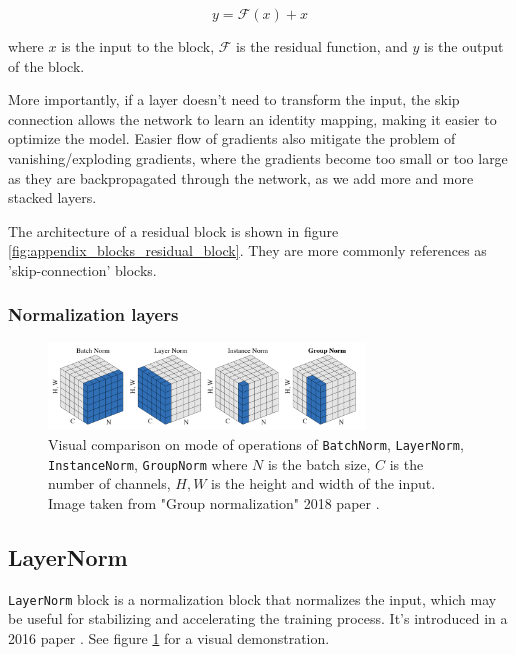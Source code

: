 \begin{equation*}
    y = \mathcal{F} (x) + x
\end{equation*}

where $x$ is the input to the block, $\mathcal{F}$ is the residual function, and $y$ is the output of the block.

More importantly, if a layer doesn't need to transform the input, the skip connection allows the network to learn an identity mapping, making it easier to optimize the model. Easier flow of gradients also mitigate the problem of vanishing/exploding gradients, where the gradients become too small or too large as they are backpropagated through the network, as we add more and more stacked layers.

The architecture of a residual block is shown in figure \ref{fig:appendix_blocks_residual_block}. They are more commonly references as 'skip-connection' blocks.






\subsubsection{Normalization layers}
\label{appendix:blocks_norm}

\begin{figure}
    \centering
    \includegraphics[width=0.75\textwidth]{images/appendix/blocks/norm.png}
    \caption{Visual comparison on mode of operations of \texttt{BatchNorm}, \texttt{LayerNorm}, \texttt{InstanceNorm}, \texttt{GroupNorm} where $N$ is the batch size, $C$ is the number of channels, $H,W$ is the height and width of the input. Image taken from "Group normalization" 2018 paper \cite{wu2018group}.}
    \label{fig:appendix_blocks_norm}
\end{figure}

\subsection*{LayerNorm}

\texttt{LayerNorm} block is a normalization block that normalizes the input, which may be useful for stabilizing and accelerating the training process. It's introduced in a 2016 paper \cite{layernorm}. See figure \ref{fig:appendix_blocks_norm} for a visual demonstration.

